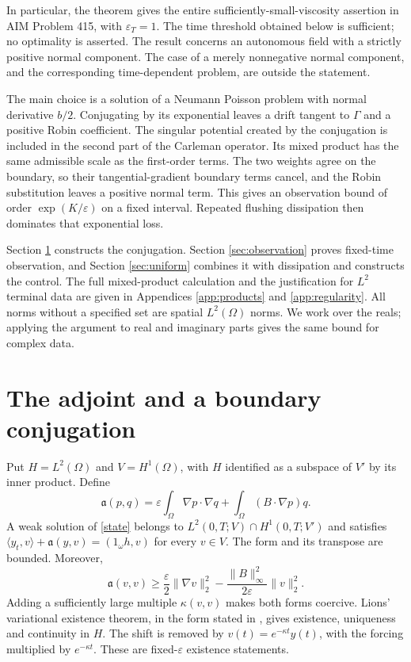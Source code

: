 \documentclass[11pt]{article}
\theoremstyle{remark}
\newcommand{\eps}{\varepsilon}
\begin{document}
In particular, the theorem gives the entire sufficiently-small-viscosity
assertion in AIM Problem 415, with $\eps_T=1$. The time threshold obtained
below is sufficient; no optimality is asserted. The result concerns an
autonomous field with a strictly positive normal component. The case of a
merely nonnegative normal component, and the corresponding time-dependent
problem, are outside the statement.

The main choice is a solution of a Neumann Poisson problem with normal
derivative $b/2$. Conjugating by its exponential leaves a drift tangent to
$\Gamma$ and a positive Robin coefficient. The singular potential created by
the conjugation is included in the second part of the Carleman operator.
Its mixed product has the same admissible scale as the first-order terms.
The two weights agree on the boundary, so their tangential-gradient boundary
terms cancel, and the Robin substitution leaves a positive normal term. This
gives an observation bound of order $\exp(K/\eps)$ on a fixed interval.
Repeated flushing dissipation then dominates that exponential loss.

Section \ref{sec:adjoint} constructs the conjugation. Section
\ref{sec:observation} proves fixed-time observation, and Section
\ref{sec:uniform} combines it with dissipation and constructs the control.
The full mixed-product calculation and the justification for $L^2$ terminal
data are given in Appendices \ref{app:products} and \ref{app:regularity}.
All norms without a specified set are spatial $L^2(\Omega)$ norms. We work
over the reals; applying the argument to real and imaginary parts gives the
same bound for complex data.

\section{The adjoint and a boundary conjugation}\label{sec:adjoint}

Put $H=L^2(\Omega)$ and $V=H^1(\Omega)$, with $H$ identified as a subspace of
$V'$ by its inner product. Define
\[
 \mathfrak a(p,q)=\eps\int_\Omega\nabla p\cdot\nabla q
                        +\int_\Omega(B\cdot\nabla p)q.
\]
A weak solution of \eqref{state} belongs to
$L^2(0,T;V)\cap H^1(0,T;V')$ and satisfies
$\langle y_t,v\rangle+\mathfrak a(y,v)=(1_\omega h,v)$ for every $v\in V$.
The form and its transpose are bounded. Moreover,
\[
 \mathfrak a(v,v)\ge\frac\eps2\|\nabla v\|_2^2
                    -\frac{\|B\|_\infty^2}{2\eps}\|v\|_2^2.
\]
Adding a sufficiently large multiple $\kappa(v,v)$ makes both forms coercive.
Lions' variational existence theorem, in the form stated in
\cite[Theorem 1.1]{Dier}, gives existence, uniqueness and continuity in $H$.
The shift is removed by $v(t)=e^{-\kappa t}y(t)$, with the forcing multiplied
by $e^{-\kappa t}$. These are fixed-$\eps$ existence statements.
\end{document}
